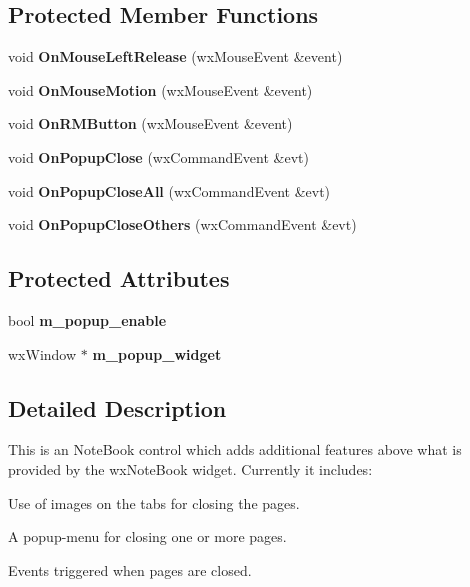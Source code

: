 \subsection*{Protected Member Functions}
\begin{DoxyCompactItemize}
\item 
void {\bf OnMouseLeftRelease} (wxMouseEvent \&event)\label{classCMuleNotebook_a418a7f6345aa6d1fcf689d794391c875}

\item 
void {\bf OnMouseMotion} (wxMouseEvent \&event)\label{classCMuleNotebook_ab1c1901acd682de87fafce68d0a52ff8}

\item 
void {\bf OnRMButton} (wxMouseEvent \&event)\label{classCMuleNotebook_ab00e9c42adc0725876590cc9f40feeb1}

\item 
void {\bf OnPopupClose} (wxCommandEvent \&evt)\label{classCMuleNotebook_a1521f281ea66344c14957986fa788190}

\item 
void {\bf OnPopupCloseAll} (wxCommandEvent \&evt)\label{classCMuleNotebook_a24e7c221b5c65c281da072f633772336}

\item 
void {\bf OnPopupCloseOthers} (wxCommandEvent \&evt)\label{classCMuleNotebook_a45a8f8a6e50dfc2d4cecf167fcb83acf}

\end{DoxyCompactItemize}
\subsection*{Protected Attributes}
\begin{DoxyCompactItemize}
\item 
bool {\bf m\_\-popup\_\-enable}\label{classCMuleNotebook_a48dabc1cb5dd12168fa57f647397a058}

\item 
wxWindow $\ast$ {\bf m\_\-popup\_\-widget}\label{classCMuleNotebook_afa2031e32ab2dcf791f281f660545b48}

\end{DoxyCompactItemize}


\subsection{Detailed Description}
This is an NoteBook control which adds additional features above what is provided by the wxNoteBook widget. Currently it includes:
\begin{DoxyItemize}
\item Use of images on the tabs for closing the pages.
\item A popup-\/menu for closing one or more pages.
\item Events triggered when pages are closed. 
\end{DoxyItemize}

